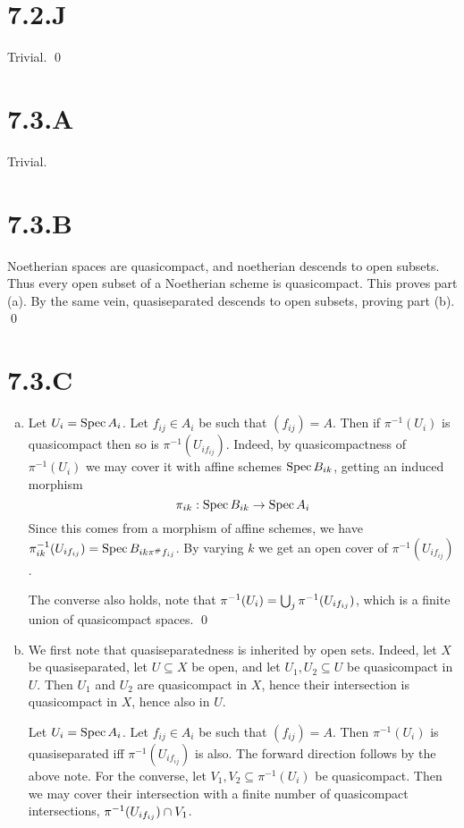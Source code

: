 \documentclass{article}
\begin{document}
\section{7.2.J}
Trivial. \qed

\section{7.3.A}
Trivial.

\section{7.3.B}
Noetherian spaces are quasicompact, and noetherian descends to open subsets.
Thus every open subset of a Noetherian scheme is quasicompact. This proves part
(a). By the same vein, quasiseparated descends to open subsets, proving part
(b). \qed

\section{7.3.C}
\begin{enumerate}[a.]
    \item Let $U_i=\operatorname{Spec} A_i$. Let $f_{ij} \in A_i$ be such that $(f_{ij})=A$.
          Then if $\pi^{-1}(U_i)$ is quasicompact then so is
          $\pi^{-1}(U_{if_{ij}})$. Indeed, by
          quasicompactness of $\pi^{-1}(U_i)$ we may cover it with affine
          schemes $\operatorname{Spec}
              B_{ik}$, getting an induced morphism \[\pi_{ik}: \operatorname{Spec} B_{ik} \to
              \operatorname{Spec} A_i\]
          Since this comes from a morphism of affine schemes, we have
          $\pi_{ik}^{-1}(U_{if_{ij}})=\operatorname{Spec} B_{ik\pi^{\#}f_{ij}}$. By varying
          $k$ we get an open cover of
          $\pi^{-1}(U_{if_{ij}})$.

          The converse also holds, note that $\pi^{-1}(U_i)=\bigcup_j
              \pi^{-1}(U_{if_{ij}})$, which is a finite union of quasicompact
          spaces.
          \qed
    \item We first note that quasiseparatedness is inherited by open sets.
          Indeed, let $X$ be quasiseparated, let $U \subseteq X$ be open, and
          let $U_1,
              U_2 \subseteq U$ be quasicompact in $U$. Then $U_1$ and $U_2$ are
          quasicompact
          in $X$, hence their intersection is quasicompact in $X$, hence also
          in $U$.

          Let $U_i=\operatorname{Spec} A_i$. Let $f_{ij} \in A_i$ be such that $(f_{ij})=A$.
          Then $\pi^{-1}(U_i)$ is quasiseparated iff $\pi^{-1}(U_{if_{ij}})$ is
          also.
          The forward direction follows by the above note. For the converse,
          let $V_1,
              V_2 \subseteq \pi^{-1}(U_i)$ be quasicompact. Then we may cover
          their
          intersection with a finite number of quasicompact intersections,
          $\pi^{-1}(U_{if_{ij}}) \cap V_1$.
\end{enumerate}
\end{document}
